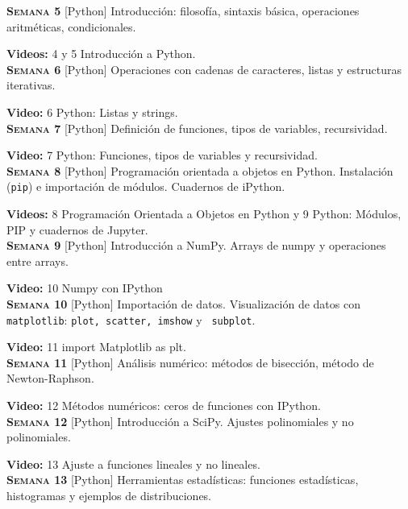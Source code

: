 \documentclass[letterpaper,10pt,onecolumn]{article}
\begin{document}
\noindent\textbf{\textsc{Semana 5}} [Python] Introducción: filosofía,
sintaxis básica, operaciones aritméticas, condicionales.

\textbf{Videos:} 4 y 5 Introducci\'on a Python.
\\[-0.3cm]   

\noindent\textbf{\textsc{Semana 6}} [Python] Operaciones con cadenas de
caracteres, listas y estructuras iterativas.

\textbf{Video:} 6  Python: Listas y strings.
\\[-0.3cm] 

\noindent\textbf{\textsc{Semana 7}} [Python] Definición de funciones,
tipos de variables, recursividad. 

\textbf{Video:} 7 Python: Funciones, tipos de variables y recursividad.
\\[-0.3cm] 

\noindent\textbf{\textsc{Semana 8}} [Python] Programaci\'on orientada a objetos en Python. Instalación (\verb+pip+) e importación de módulos. Cuadernos de iPython.

\textbf{Videos:} 8 Programación Orientada a Objetos en Python y 9 Python: Módulos, PIP y cuadernos de Jupyter.
\\[-0.3cm]  

\noindent\textbf{\textsc{Semana 9}} [Python] Introducción a NumPy. Arrays de numpy y operaciones entre arrays. 

\textbf{Video:} 10 Numpy con IPython
\\[-0.3cm]  

\noindent\textbf{\textsc{Semana 10}} [Python] Importación de datos. Visualización de datos con
\verb+matplotlib+: \verb+plot, scatter, imshow+ y  \verb+ subplot+.

\textbf{Video:} 11 import Matplotlib as plt.
\\[-0.3cm]  

\noindent\textbf{\textsc{Semana 11}} [Python] Análisis numérico: métodos de bisección, método de Newton-Raphson. 

\textbf{Video:} 12 Métodos numéricos: ceros de funciones con IPython.
\\[-0.3cm]  

\noindent\textbf{\textsc{Semana 12}} [Python] Introducción a
SciPy. Ajustes polinomiales y no polinomiales.

\textbf{Video:} 13 Ajuste a funciones lineales y no lineales.
\\[-0.3cm]  

\noindent\textbf{\textsc{Semana 13}} [Python] Herramientas
estadísticas: funciones estadísticas, histogramas y ejemplos de
distribuciones.
\end{document}

